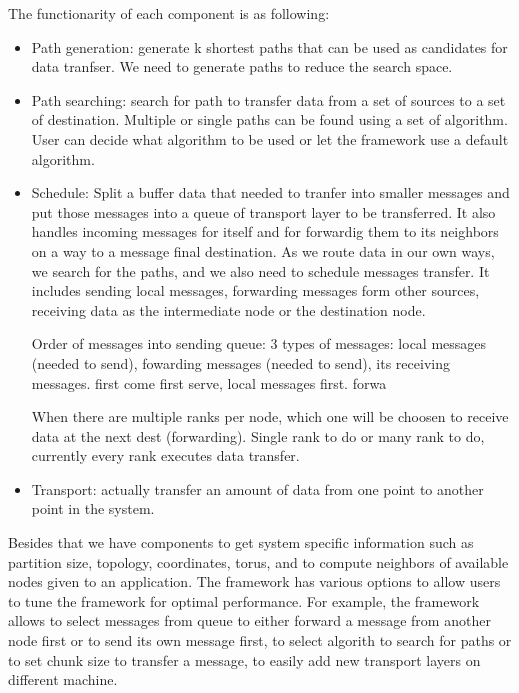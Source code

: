 The functionarity of each component is as following:
\begin{itemize}
\item Path generation: generate k shortest paths that can be used as candidates for data tranfser. We need to generate paths to reduce the search space.
\item Path searching: search for path to transfer data from a set of sources to a set of destination. Multiple or single paths can be found using a set of algorithm. User can decide what algorithm to be used or let the framework use a default algorithm.
\item Schedule: Split a buffer data that needed to tranfer into smaller messages and put those messages into a queue of transport layer to be transferred. It also handles incoming messages for itself and for forwardig them to its neighbors on a way to a message final destination.
As we route data in our own ways, we search for the paths, and we also need to schedule messages transfer. It includes sending local messages, forwarding messages form other sources, receiving data as the intermediate node or the destination node.

Order of messages into sending queue: 3 types of messages: local messages (needed to send), fowarding messages (needed to send), its receiving messages. first come first serve, local messages first. forwa

When there are multiple ranks per node, which one will be choosen to receive data at the next dest (forwarding). Single rank to do or many rank to do, currently every rank executes data transfer.

\item Transport: actually transfer an amount of data from one point to another point in the system.

\end{itemize}

Besides that we have components to get system specific information such as partition size, topology, coordinates, torus, and to compute neighbors of available nodes given to an application. The framework has various options to allow users to tune the framework for optimal performance. For example, the framework allows to select messages from queue to either forward a message from another node first or to send its own message first, to select algorith to search for paths or to set chunk size to transfer a message, to easily add new transport layers on different machine.
